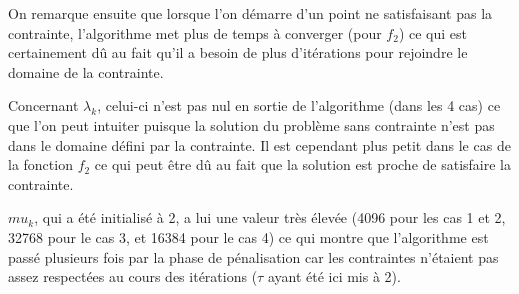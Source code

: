 \documentclass[12pt]{article}	%
\begin{document}
On remarque ensuite que lorsque l'on démarre d'un point ne satisfaisant pas la contrainte, l'algorithme met plus de temps à converger (pour $f_2$) ce qui est certainement dû au fait qu'il a besoin de plus d'itérations pour rejoindre le domaine de la contrainte.

Concernant $\lambda_k$, celui-ci n'est pas nul en sortie de l'algorithme (dans les 4 cas) ce que l'on peut intuiter puisque la solution du problème sans contrainte n'est pas dans le domaine défini par la contrainte. Il est cependant plus petit dans le cas de la fonction $f_2$ ce qui peut être dû au fait que la solution est proche de satisfaire la contrainte.

$mu_k$, qui a été initialisé à 2, a lui une valeur très élevée (4096 pour les cas 1 et 2, 32768 pour le cas 3, et 16384 pour le cas 4) ce qui montre que l'algorithme est passé plusieurs fois par la phase de pénalisation car les contraintes n'étaient pas assez respectées au cours des itérations ($\tau$ ayant été ici mis à 2).
\end{document}
